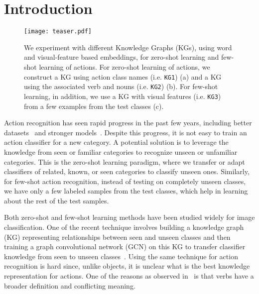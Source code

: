 \section{Introduction}
\label{intro}
\begin{figure*}
    \centering
\texttt{[image: teaser.pdf]}\\
\caption{We experiment with different Knowledge Graphs (KGs), using word and visual-feature based embeddings, for zero-shot learning and few-shot learning of actions. For zero-shot learning of actions, we construct a KG using action class names (i.e. \texttt{KG1}) (a) and a KG using the associated verb and nouns (i.e. \texttt{KG2}) (b). For few-shot learning, in addition, we use a KG with visual features (i.e. \texttt{KG3}) from a few examples from the test classes (c).}
\label{fig:teaser}
\end{figure*}

Action recognition has seen rapid progress in the past few years, including better datasets~\cite{gu2018ava,kay2017kinetics} and stronger models~\cite{carreira2017quo,diba2017temporal,qiu2017learning,tran2018closer,wang2016temporal,xiang2018s3d,zhang2017deep}. Despite this progress, it is not easy to train an action classifier for a new category. A potential solution is to leverage the knowledge from seen or familiar categories to recognize unseen or unfamiliar categories. This is the zero-shot learning paradigm, where we transfer or adapt classifiers of related, known, or seen categories to classify unseen ones. Similarly, for few-shot action recognition, instead of testing on completely unseen classes, we have only a few labeled samples from the test classes, which help in learning about the rest of the test samples. 


Both zero-shot and few-shot learning methods have been studied widely for image classification.  One of the recent technique involves building a knowledge graph (KG) representing relationships between seen and unseen classes and then training a graph convolutional network (GCN) on this KG to transfer classifier knowledge from seen to unseen classes~\cite{wang2018zero}. Using the same technique for action recognition is hard since, unlike objects, it is unclear what is the best knowledge representation for actions. One of the reasons as observed in~\cite{verb_noun} is that verbs have a broader definition and conflicting meaning.


